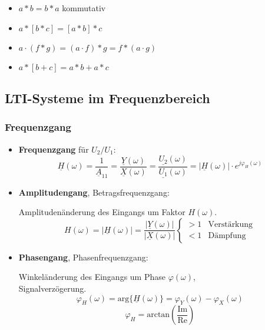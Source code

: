 \begin{mdframed}[style=exercise,frametitle=Rechenregeln]
  \begin{itemize}
	\item {$a*b=b*a$} {\small \qquad kommutativ}
	\item $a*[b*c]=[a*b]*c$
	\item $a\cdot(f*g)=(a\cdot f) * g = f * (a\cdot g)$
	\item $a*[b+c]=a*b+a*c$
  \end{itemize}
\end{mdframed}
\clearpage
\subsection{LTI-Systeme im Frequenzbereich}
\subsubsection{Frequenzgang}
  \begin{itemize}
      \item{\textbf{Frequenzgang}} für $U_2/U_1$:
          \[
              \underline{H}(\omega) = \frac{1}{\underline{A}_{11}} =
              \frac{\underline{Y}(\omega)}{\underline{X}(\omega)} =
              \frac{\underline{U_2}(\omega)}{\underline{U_1}(\omega)} = |\underline{H}(\omega)|\cdot e^{j\varphi_H(\omega)}
          \]
      \item{\textbf{Amplitudengang}}, Betragsfrequenzgang:
      
      {\small Amplitudenänderung des Eingangs um Faktor $H(\omega)$}.
          \[
              H(\omega) = |\underline{H}(\omega)| =
              \frac{|\underline{Y}(\omega)|}{|\underline{X}(\omega)|}
              \begin{cases}
                  > 1 & \text{Verst\"arkung}\\
                  < 1 & \text{D\"ampfung}
              \end{cases}
          \]
      \item{\textbf{Phasengang}}, Phasenfrequenzgang:
      
      {\small Winkeländerung des Eingangs um Phase $\varphi(\omega)$,\\ Signalverzögerung}.
          \[
              \varphi_H(\omega) = \text{arg}\{\underline{H}(\omega)\} =
              \varphi_Y(\omega) - \varphi_X(\omega)
          \]
          \[
              \varphi_H = \text{arctan}\left(\frac{\text{Im}}{\text{Re}}\right)
          \]
  \end{itemize}
